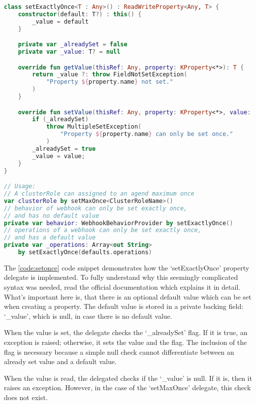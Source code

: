 \begin{minipage}{\linewidth}
\begin{lstlisting}[caption={setExactlyOnce implementation},language=Kotlin,label=code:setonce]
class setExactlyOnce<T : Any>() : ReadWriteProperty<Any, T> {
    constructor(default: T?) : this() {
        _value = default
    }

    private var _alreadySet = false
    private var _value: T? = null

    override fun getValue(thisRef: Any, property: KProperty<*>): T {
        return _value ?: throw FieldNotSetException(
            "Property ${property.name} not set."
        )
    }

    override fun setValue(thisRef: Any, property: KProperty<*>, value: T) {
        if (_alreadySet)
            throw MultipleSetException(
                "Property ${property.name} can only be set once."
            )
        _alreadySet = true
        _value = value;
    }
}

// Usage:
// A clusterRole can assigned to an agend maximum once
var clusterRole by setMaxOnce<ClusterRoleName>()
// behavior of webhook can only be set exactly once,
// and has no default value
private var behavior: WebhookBehaviorProvider by setExactlyOnce()
// operations of a webhook can only be set exactly once,
// and has a default value
private var _operations: Array<out String>
    by setExactlyOnce(defaults.operations)
\end{lstlisting}
\end{minipage}

The \ref{code:setonce} code snippet demonstrates how the `setExactlyOnce' property delegate is implemented. To fully understand why this seemingly complicated syntax was needed, read the official documentation which explains it in detail. What's important here is, that there is an optional default value which can be set when creating a property. The default value is stored in a private backing field: `\_value', which is null, in case there is no default value. 

When the value is set, the delegate checks the `\_alreadySet' flag. If it is true, an exception is raised; otherwise, it sets the value and the flag. The inclusion of the flag is necessary because a simple null check cannot differentiate between an already set value and a default value.

When the value is read, the delegated checks if the `\_value' is null. If it is, then it raises an exception. However, in the case of the `setMaxOnce' delegate, this check does not exist.


